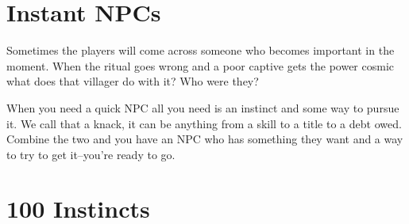 \section{Instant NPCs}


 Sometimes the players will come across someone who becomes important in the moment. When the ritual goes wrong and a poor captive gets the power cosmic what does that villager do with it? Who were they?


 When you need a quick NPC all you need is an instinct and some way to pursue it. We call that a knack, it can be anything from a skill to a title to a debt owed. Combine the two and you have an NPC who has something they want and a way to try to get it--you're ready to go.
\section*{100 Instincts}
